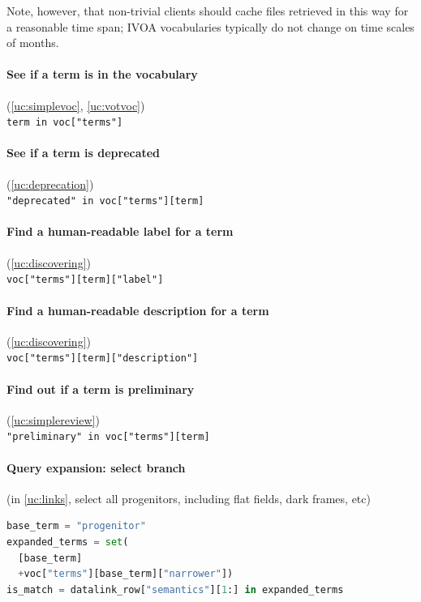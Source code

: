 \documentclass[11pt,a4paper]{ivoa}
\begin{document}
Note, however, that non-trivial clients should cache files retrieved in
this way for a reasonable time span; IVOA vocabularies typically do not
change on time scales of months.

\paragraph{See if a term is in the vocabulary} (\ref{uc:simplevoc},
\ref{uc:votvoc})\\ \lstinline{term in voc["terms"]}

\paragraph{See if a term is deprecated} (\ref{uc:deprecation})\\
\lstinline{"deprecated" in voc["terms"][term]}

\paragraph{Find a human-readable label for a term}
(\ref{uc:discovering})\\
\lstinline{voc["terms"][term]["label"]}

\paragraph{Find a human-readable description for a term}
(\ref{uc:discovering})\\
\lstinline{voc["terms"][term]["description"]}

\paragraph{Find out if a term is preliminary} (\ref{uc:simplereview})\\
\lstinline{"preliminary" in voc["terms"][term]}

\paragraph{Query expansion: select branch} (in \ref{uc:links}, select all
progenitors, including flat fields, dark frames, etc)
\begin{lstlisting}[language=python]
base_term = "progenitor"
expanded_terms = set(
  [base_term]
  +voc["terms"][base_term]["narrower"])
is_match = datalink_row["semantics"][1:] in expanded_terms
\end{lstlisting}
\end{document}
